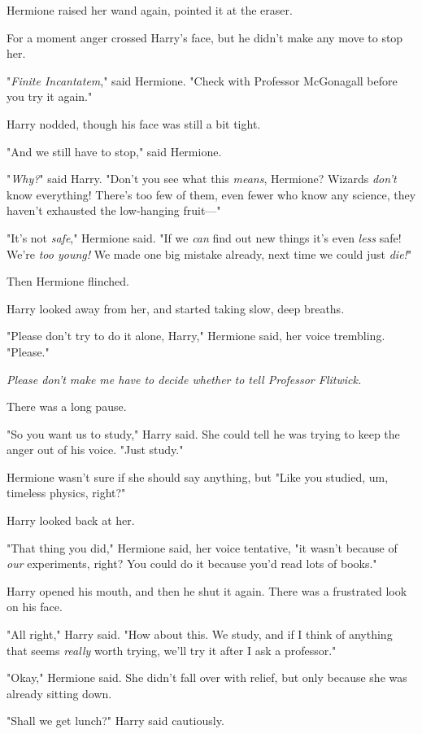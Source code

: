 Hermione raised her wand again, pointed it at the eraser.

For a moment anger crossed Harry's face, but he didn't make any move to stop
her.

"\emph{Finite Incantatem}," said Hermione. "Check with Professor McGonagall
before you try it again."

Harry nodded, though his face was still a bit tight.

"And we still have to stop," said Hermione.

"\emph{Why?}" said Harry. "Don't you see what this \emph{means}, Hermione?
Wizards \emph{don't} know everything! There's too few of them, even fewer who
know any science, they haven't exhausted the low-hanging fruit\mbox{---}"

"It's not \emph{safe}," Hermione said. "If we \emph{can} find out new things
it's even \emph{less} safe! We're \emph{too young!} We made one big mistake
already, next time we could just \emph{die!}"

Then Hermione flinched.

Harry looked away from her, and started taking slow, deep breaths.

"Please don't try to do it alone, Harry," Hermione said, her voice trembling.
"Please."

\emph{Please don't make me have to decide whether to tell Professor Flitwick.}

There was a long pause.

"So you want us to study," Harry said. She could tell he was trying to keep the
anger out of his voice. "Just study."

Hermione wasn't sure if she should say anything, but{\el} "Like you studied,
um, timeless physics, right?"

Harry looked back at her.

"That thing you did," Hermione said, her voice tentative, "it wasn't because of
\emph{our} experiments, right? You could do it because you'd read lots of
books."

Harry opened his mouth, and then he shut it again. There was a frustrated look
on his face.

"All right," Harry said. "How about this. We study, and if I think of anything
that seems \emph{really} worth trying, we'll try it after I ask a professor."

"Okay," Hermione said. She didn't fall over with relief, but only because she
was already sitting down.

"Shall we get lunch?" Harry said cautiously.

